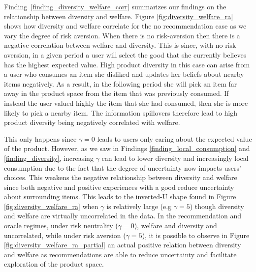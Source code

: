 \documentclass[format=acmsmall, review=false]{acmart}
\begin{document}
Finding~\ref{finding_diversity_welfare_corr} summarizes our findings on the relationship between diversity and welfare. Figure \ref{fig:diversity_welfare_ra} shows how diversity and welfare correlate for the no recommendation case as we vary the degree of risk aversion. When there is no risk-aversion then there is a negative correlation between welfare and diversity. This is since, with no risk-aversion, in a given period a user will select the good that she currently believes has the highest expected value. High product diversity in this case can arise from a user who consumes an item she disliked and updates her beliefs about nearby items negatively. As a result, in the following period she will pick an item far away in the product space from the item that was previously consumed. If instead the user valued highly the item that she had consumed, then she is more likely to pick a nearby item. The information spillovers therefore lead to high product diversity being negatively correlated with welfare.
\par
This only happens since $\gamma = 0$ leads to users only caring about the expected value of the product. However, as we saw in Findings \ref{finding_local_consumption} and \ref{finding_diversity}, increasing $\gamma$ can lead to lower diversity and increasingly local consumption due to the fact that the degree of uncertainty now impacts users' choices. This weakens the negative relationship between diversity and welfare since both negative and positive experiences with a good reduce uncertainty about surrounding items. This leads to the inverted-U shape found in Figure \ref{fig:diversity_welfare_ra} when $\gamma$ is relatively large (e.g $\gamma = 5$) though diversity and welfare are virtually uncorrelated in the data. In the recommendation and oracle regimes, under risk neutrality ($\gamma=0$), welfare and diversity and uncorrelated, while under risk aversion ($\gamma=5$), it is possible to observe in Figure \ref{fig:diversity_welfare_ra_partial} an actual positive relation between diversity and welfare as recommendations are able to reduce uncertainty and facilitate exploration of the product space.
\end{document}
